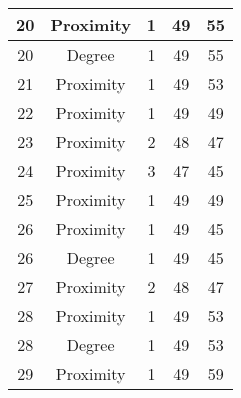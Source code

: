 \documentclass[results.tex]{subfiles}
\begin{document}
\begin{center}
\begin{tabular}{| c || c | c | c | c |}
            \hline
            20                      & Proximity                    & 1                      & 49                      & 55                   \\
            \hline
            20                      & Degree                       & 1                      & 49                      & 55                   \\
            \hline
            21                      & Proximity                    & 1                      & 49                      & 53                   \\
            \hline
            22                      & Proximity                    & 1                      & 49                      & 49                   \\
            \hline
            23                      & Proximity                    & 2                      & 48                      & 47                   \\
            \hline
            24                      & Proximity                    & 3                      & 47                      & 45                   \\
            \hline
            25                      & Proximity                    & 1                      & 49                      & 49                   \\
            \hline
            26                      & Proximity                    & 1                      & 49                      & 45                   \\
            \hline
            26                      & Degree                       & 1                      & 49                      & 45                   \\
            \hline
            27                      & Proximity                    & 2                      & 48                      & 47                   \\
            \hline
            28                      & Proximity                    & 1                      & 49                      & 53                   \\
            \hline
            28                      & Degree                       & 1                      & 49                      & 53                   \\
            \hline
            29                      & Proximity                    & 1                      & 49                      & 59                   \\

\end{tabular}
\end{center}
\end{document}
